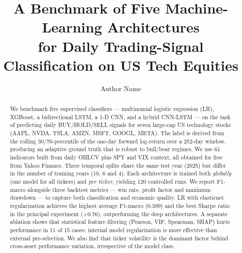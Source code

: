 \documentclass[runningheads]{llncs}
\begin{document}
\title{A Benchmark of Five Machine-Learning Architectures \\for Daily Trading-Signal Classification on US Tech Equities}


\author{Author Name}



\maketitle

\begin{abstract}
We benchmark five supervised classifiers --- multinomial logistic regression (LR), XGBoost, a bidirectional LSTM, a 1-D CNN, and a hybrid CNN-LSTM --- on the task of predicting daily BUY/HOLD/SELL signals for seven large-cap US technology stocks (AAPL, NVDA, TSLA, AMZN, MSFT, GOOGL, META). The label is derived from the rolling 30/70-percentile of the one-day forward log-return over a 252-day window, producing an adaptive ground truth that is robust to bull/bear regimes. We use 61 indicators built from daily OHLCV plus SPY and VIX context, all obtained for free from Yahoo Finance. Three temporal splits share the same test year (2025) but differ in the number of training years (10, 6 and 4). Each architecture is trained both \emph{globally} (one model for all tickers) and \emph{per ticker}, yielding 120 controlled runs. We report F1-macro alongside three backtest metrics --- win rate, profit factor and maximum drawdown --- to capture both classification and economic quality. LR with elasticnet regularization achieves the highest average F1-macro (0.399) and the best Sharpe ratio in the principal experiment (+0.76), outperforming the deep architectures. A separate ablation shows that statistical feature filtering (Pearson, VIF, Spearman, SHAP) hurts performance in 11 of 15 cases: internal model regularization is more effective than external pre-selection. We also find that ticker volatility is the dominant factor behind cross-asset performance variation, irrespective of the model class.
\end{abstract}
\end{document}
